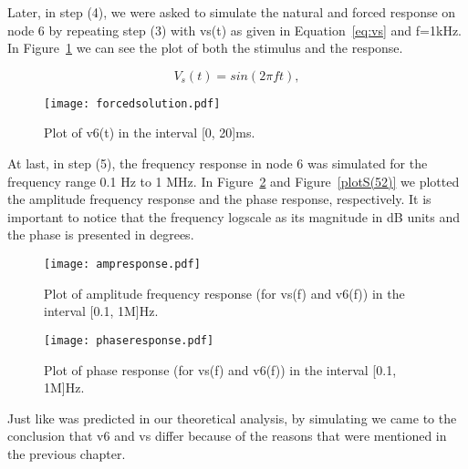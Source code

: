Later, in step (4), we were asked to simulate the natural and forced response on node 6 by repeating step (3) with vs(t) as given in Equation~\ref{eq:vs} and f=1kHz. In Figure~\ref{fig:plotS(4)} we can see the plot of both the stimulus and the response.

\begin{equation}
  V_{s}(t) = sin(2 \pi f t),
  \label{eq:vs}
\end{equation}

\begin{figure}[h] \centering
\texttt{[image: forcedsolution.pdf]}
\caption{Plot of v6(t) in the interval [0, 20]ms.}
\label{fig:plotS(4)}
\end{figure}

At last, in step (5), the frequency response in node 6 was simulated  for the frequency range 0.1 Hz to 1 MHz. In Figure~\ref{fig:plotS(51)} and Figure~\ref{plotS(52)} we plotted the amplitude frequency response and the phase response, respectively. It is important to notice that the frequency logscale as its magnitude in dB units and the phase is presented in degrees.

\begin{figure}[h] \centering
\texttt{[image: ampresponse.pdf]}
\caption{Plot of amplitude frequency response (for vs(f) and v6(f)) in the interval [0.1, 1M]Hz.}
\label{fig:plotS(51)}
\end{figure}

\begin{figure}[h] \centering
\texttt{[image: phaseresponse.pdf]}
\caption{Plot of phase response (for vs(f) and v6(f)) in the interval [0.1, 1M]Hz.}
\label{fig:plotS(52)}
\end{figure}

Just like was predicted in our theoretical analysis, by simulating we came to the conclusion that v6 and vs differ because of the reasons that were mentioned in the previous chapter.


